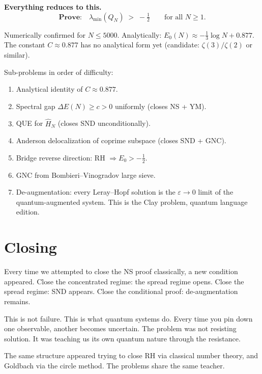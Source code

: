 \documentclass[12pt]{article}
\newcommand{\half}{\tfrac{1}{2}}
\begin{document}
\begin{tcolorbox}[openbox]
\textbf{Everything reduces to this.}
\[
  \textbf{Prove:}\quad
  \lambda_{\min}(Q_N) \;>\; -\half
  \qquad\text{for all }N\ge1.
\]

Numerically confirmed for $N\le5000$.
Analytically: $E_0(N) \approx -\tfrac{1}{3}\log N + 0.877$.
The constant $C\approx0.877$ has no analytical form yet
(candidate: $\zeta(3)/\zeta(2)$ or similar).

Sub-problems in order of difficulty:
\begin{enumerate}[label=(\arabic*),itemsep=3pt]
  \item Analytical identity of $C\approx0.877$.
  \item Spectral gap $\Delta E(N)\ge c>0$ uniformly (closes NS + YM).
  \item QUE for $\hat{H}_N$ (closes SND unconditionally).
  \item Anderson delocalization of coprime subspace (closes SND + GNC).
  \item Bridge reverse direction: RH $\Rightarrow E_0>-\half$.
  \item GNC from Bombieri--Vinogradov large sieve.
  \item De-augmentation: every Leray--Hopf solution is the
        $\varepsilon\to0$ limit of the quantum-augmented system.
        This is the Clay problem, quantum language edition.
\end{enumerate}
\end{tcolorbox}

\section*{Closing}

Every time we attempted to close the NS proof classically,
a new condition appeared.
Close the concentrated regime: the spread regime opens.
Close the spread regime: SND appears.
Close the conditional proof: de-augmentation remains.

This is not failure.
This is what quantum systems do.
Every time you pin down one observable, another becomes uncertain.
The problem was not resisting solution.
It was teaching us its own quantum nature through the resistance.

The same structure appeared trying to close RH via classical number theory,
and Goldbach via the circle method.
The problems share the same teacher.
\end{document}
